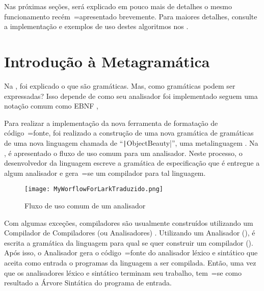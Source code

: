 Nas próximas seções,
será explicado em pouco mais de detalhes o mesmo funcionamento recém~=apresentado brevemente.
Para maiores detalhes,
consulte a implementação e
exemplos de uso destes algoritmos nos .


\section{Introdução à Metagramática}
\label{section:GrammarsGrammar}

Na ,
foi explicado o que são gramáticas.
Mas,
como gramáticas podem ser expressadas?
Isso depende de como seu analisador foi implementado  seguem uma notação comum como EBNF \cite{teachingEbnf,antlrBookTerrentParr,larkGrammarReference,larkStyleCheat},

Para realizar a implementação da nova ferramenta de formatação de código~=fonte,
foi realizado a construção de uma nova gramática de gramáticas de uma nova linguagem chamada de ``\texttt|ObjectBeauty|'',
uma metalinguagem \cite{compilersCompilerMetaLanguage}.
Na ,
é apresentado o fluxo de uso comum para um analisador.
Neste processo,
o desenvolvedor da linguagem escreve a gramática de especificação que é entregue a algum analisador e
gera~=se um compilador para tal linguagem.
\begin{figure}[!htb]
\caption{Fluxo de uso comum de um analisador}
\label{figure:MyWorflowForLarkTraduzido}
\centering
\texttt{[image: MyWorflowForLarkTraduzido.png]}
\end{figure}

Com algumas exceções,
compiladores são usualmente construídos utilizando um Compilador de Compiladores (ou Analisadores) \cite{compilersCompilerMetaLanguage}.
Utilizando um Analisador (),
é escrita a gramática da linguagem para qual se quer construir um compilador ().
Após isso,
o Analisador gera o código~=fonte do analisador léxico e
sintático que aceita como entrada o programas da linguagem a ser compilada.
Então,
uma vez que os analisadores léxico e
sintático terminam seu trabalho,
tem~=se como resultado a Árvore Sintática do programa de entrada.

